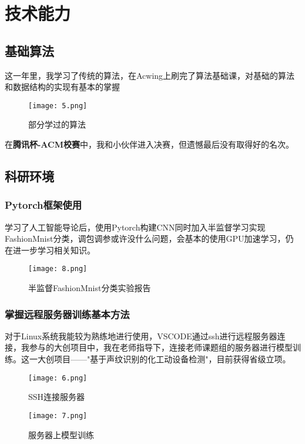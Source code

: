 \documentclass[UTF8]{ctexart}
\begin{document}
	\section{技术能力}
	\subsection{基础算法}
	这一年里，我学习了传统的算法，在Acwing上刷完了算法基础课，对基础的算法和数据结构的实现有基本的掌握
	\begin{figure}[H]  %
	\centering  %
	\texttt{[image: 5.png]} %
	\caption{部分学过的算法} %
	\label{fig:主修中文成绩单} %
	\end{figure}
	在\textbf{腾讯杯-ACM校赛}中，我和小伙伴进入决赛，但遗憾最后没有取得好的名次。
	\subsection{科研环境}
	\subsubsection{Pytorch框架使用}
	学习了人工智能导论后，使用Pytorch构建CNN同时加入半监督学习实现FashionMnist分类，调包调参或许没什么问题，会基本的使用GPU加速学习，仍在进一步学习相关知识。
	\begin{figure}[H]  %
		\centering  %
		\texttt{[image: 8.png]} %
		\caption{半监督FashionMnist分类实验报告} %
		\label{fig:主修中文成绩单} %
	\end{figure}
	\subsubsection{掌握远程服务器训练基本方法}
	对于Linux系统我能较为熟练地进行使用，VSCODE通过ssh进行远程服务器连接，我参与的大创项目中，我在老师指导下，连接老师课题组的服务器进行模型训练。这一大创项目——"基于声纹识别的化工动设备检测"，目前获得省级立项。
	\begin{figure}[H]  %
		\centering  %
		\texttt{[image: 6.png]} %
		\caption{SSH连接服务器} %
		\label{fig:主修中文成绩单} %
	\end{figure}
	\begin{figure}[H]  %
	\centering  %
	\texttt{[image: 7.png]} %
	\caption{服务器上模型训练} %
	\label{fig:主修中文成绩单} %
	\end{figure}
\end{document}
